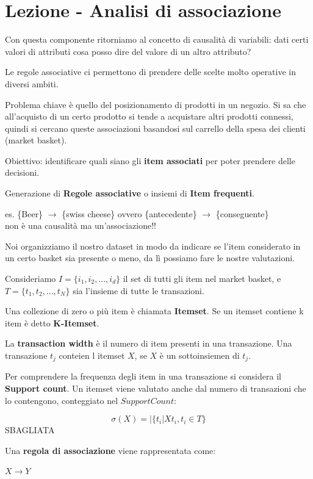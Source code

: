 

\section{Lezione - Analisi di associazione}
Con questa componente ritorniamo al concetto di causalit\`a di variabili: dati certi valori di attributi cosa posso dire del valore di un altro attributo?

Le regole associative ci permettono di prendere delle scelte molto operative in diversi ambiti. 

Problema chiave \`e quello del posizionamento di prodotti in un negozio. Si sa che all'acquisto di un certo prodotto si tende a acquistare altri prodotti connessi, quindi si cercano queste associazioni basandosi sul carrello della spesa dei clienti (market basket).

Obiettivo: identificare quali siano gli \textbf{item associati} per poter prendere delle decisioni.

Generazione di \textbf{Regole associative} o insiemi di \textbf{Item frequenti}.

es. \{Beer\} $\rightarrow$ \{swiss cheese\} ovvero \{antecedente\} $\rightarrow$ \{conseguente\}\\
non \`e una causalit\`a ma un'associazione!!

Noi organizziamo il nostro dataset in modo da indicare se l'item considerato in un certo basket sia presente o meno, da l\`i possiamo fare le nostre valutazioni.

Consideriamo $I = \{i_1, i_2,...,i_d\}$ il set di tutti gli item nel market basket, e $T = \{t_1,t_2,...,t_N\}$ sia l'insieme di tutte le transazioni.

Una collezione di zero o pi\`u item \`e chiamata \textbf{Itemset}. Se un itemset contiene k item \`e detto \textbf{K-Itemset}. 

La \textbf{transaction width} \`e il numero di item presenti in una transazione. Una transazione $t_j$ conteien l itemset $X$, se $X$ \`e un sottoinsiemen di $t_j$.

Per comprendere la frequenza degli item in una transazione si considera il \textbf{Support count}. Un itemset viene valutato anche dal numero di transazioni che lo contengono, conteggiato nel $Support Count$:

\[ \sigma(X) = |\{t_i | X  t_i, t_i \in T\} \] SBAGLIATA

Una \textbf{regola di associazione} viene rappresentata come:

$X \rightarrow Y$

